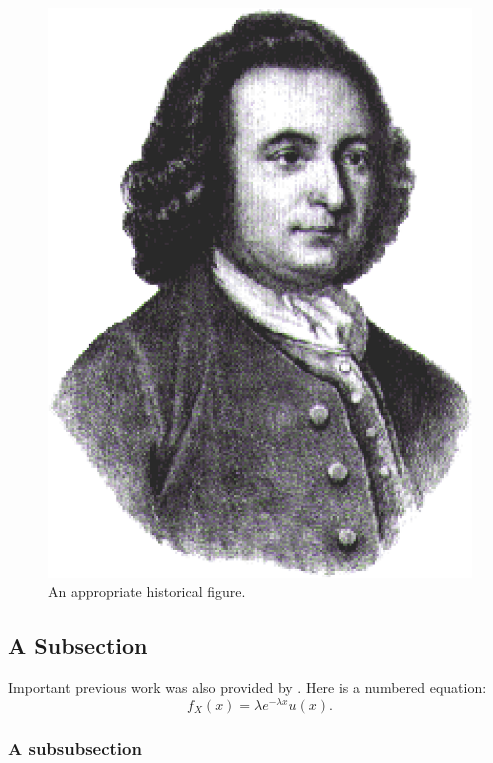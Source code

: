 \begin{figure}
  \centering
  \includegraphics[scale=0.3]{figGeorgeMason}
  \caption[An appropriate historical figure]{An appropriate historical figure.}
\end{figure}

\subsection{A Subsection}

Important previous work was also provided by \cite{Shannon49}.  Here is a numbered equation:
\begin{equation}
    f_X(x) = \lambda e^{-\lambda x} u(x).
\end{equation}

\subsubsection{A subsubsection}

